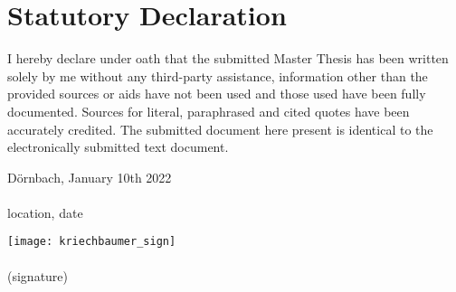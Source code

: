\documentclass[../main.tex]{subfiles}
\begin{document}
\section*{Statutory Declaration}
    I hereby declare under oath that the submitted Master Thesis has been written solely by me without any third-party assistance, information other than the provided sources or aids have not been used and those used have been fully documented. Sources for literal, paraphrased and cited quotes have been accurately credited. The submitted document here present is identical to the electronically submitted text document.\\[5cm]
    \noindent
    \begin{minipage}[h]{0.4\linewidth}
      \begin{center}
        Dörnbach, January 10th 2022\\        
        \dotfill\\
        location, date
      \end{center}
    \end{minipage}
    \hspace*{0.1\linewidth}    
    \begin{minipage}[h]{0.5\linewidth}
      \vspace*{-0.28in}
      \begin{center}
        \texttt{[image: kriechbaumer\_sign]}\\
        \vspace*{-0.15in}
        \dotfill\\
        (signature)
      \end{center}
    \end{minipage}
    
    
\end{document}
